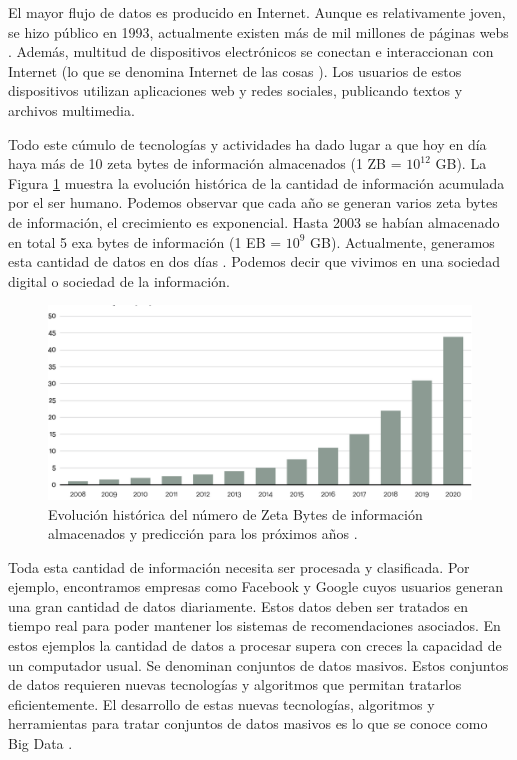 \documentclass[10pt]{article}
\begin{document}
	El mayor flujo de datos es producido en Internet. Aunque es relativamente joven, se hizo público en 1993, actualmente existen más de mil millones de páginas webs \cite{internet}. Además, multitud de dispositivos electrónicos se conectan e interaccionan con Internet (lo que se denomina Internet de las cosas \cite{big-data-internet-cosas}). Los usuarios de estos dispositivos utilizan aplicaciones web y redes sociales, publicando textos y archivos multimedia. 
	
	Todo este cúmulo de tecnologías y actividades ha dado lugar a que hoy en día haya más de 10 zeta bytes de información almacenados (1 ZB = $10^{12}$ GB). La Figura \ref{fig:zeta-bytes} muestra la evolución histórica de la cantidad de información acumulada por el ser humano. Podemos observar que cada año se generan varios zeta bytes de información, el crecimiento es exponencial. Hasta 2003 se habían almacenado en total 5 exa bytes de información (1 EB = $10^9$ GB). Actualmente, generamos esta cantidad de datos en dos días \cite{big-data}. Podemos decir que vivimos en una sociedad digital o sociedad de la información.

	\begin{figure}[H]
	       	\centering
	       	\includegraphics[width=14cm]{./images/Data.png}
	       	\caption{Evolución histórica del número de Zeta Bytes de información almacenados y predicción para los próximos años \cite{zeta-bytes}.} 
	       	\label{fig:zeta-bytes}
	 \end{figure}

	Toda esta cantidad de información necesita ser procesada y clasificada. Por ejemplo, encontramos empresas como Facebook y Google cuyos usuarios generan una gran cantidad de datos diariamente. Estos datos deben ser tratados en tiempo real para poder mantener los sistemas de recomendaciones asociados. En estos ejemplos la cantidad de datos a procesar supera con creces la capacidad de un computador usual. Se denominan conjuntos de datos masivos. Estos conjuntos de datos requieren nuevas tecnologías y algoritmos que permitan tratarlos eficientemente. El desarrollo de estas nuevas tecnologías, algoritmos y herramientas para tratar conjuntos de datos masivos es lo que se conoce como Big Data \cite{big-data-herrera}.
	
\end{document}
